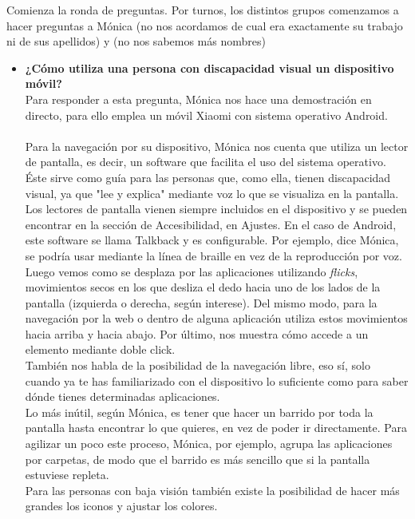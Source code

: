 \documentclass{article}
\begin{document}
	Comienza la ronda de preguntas. Por turnos, los distintos grupos comenzamos a hacer preguntas a Mónica (no nos acordamos de cual era exactamente su trabajo ni de sus apellidos) y (no nos sabemos más nombres)
	\\
	\begin{itemize}
		\item  \textbf{¿Cómo utiliza una persona con discapacidad visual un dispositivo móvil?}
		\\
		Para responder a esta pregunta, Mónica nos hace una demostración en directo, para ello emplea un móvil Xiaomi con sistema operativo Android.
		\\
		\\
		Para la navegación por su dispositivo, Mónica nos cuenta que utiliza un lector de pantalla, es decir, un software que facilita el uso del sistema operativo. Éste sirve como guía para las personas que, como ella, tienen discapacidad visual, ya que "lee y explica" mediante voz lo que se visualiza en la pantalla. Los lectores de pantalla vienen siempre incluidos en el dispositivo y se pueden encontrar en la sección de Accesibilidad, en Ajustes. En el caso de Android, este software se llama Talkback y es configurable. Por ejemplo, dice Mónica, se podría usar mediante la línea de braille en vez de la reproducción por voz.
		\\
		Luego vemos como se desplaza por las aplicaciones utilizando \textit{flicks}, movimientos secos en los que desliza el dedo hacia uno de los lados de la pantalla (izquierda o derecha, según interese). Del mismo modo, para la navegación por la web o dentro de alguna aplicación utiliza estos movimientos hacia arriba y hacia abajo. Por último, nos muestra cómo accede a un elemento mediante doble click. 
		\\
		También nos habla de la posibilidad de la navegación libre, eso sí, solo cuando ya te has familiarizado con el dispositivo lo suficiente como para saber dónde tienes determinadas aplicaciones. 
		\\
		Lo más inútil, según Mónica, es tener que hacer un barrido por toda la pantalla hasta encontrar lo que quieres, en vez de poder ir directamente. Para agilizar un poco este proceso, Mónica, por ejemplo, agrupa las aplicaciones por carpetas, de modo que el barrido es más sencillo que si la pantalla estuviese repleta.
		\\
		Para las personas con baja visión también existe la posibilidad de hacer más grandes los iconos y ajustar los colores.
		\\

\end{itemize}
\end{document}
